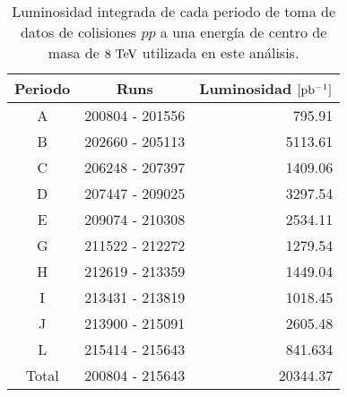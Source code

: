 
\begin{table}[ht]
  \centering
  \caption{Luminosidad integrada de cada periodo de toma de datos de colisiones
    $pp$ a una energía de centro de masa de $8 \tev$ utilizada en este
    análisis.}
  \label{tab:data_periods}

  \begin{tabular}{ccr}
    \hline
    Periodo & Runs & Luminosidad $[\mbox{pb$^{-1}$}]$ \\
    \hline
    A & 200804 - 201556 & 795.91 \\
    B & 202660 - 205113 & 5113.61 \\
    C & 206248 - 207397 & 1409.06 \\
    D & 207447 - 209025 & 3297.54 \\
    E & 209074 - 210308 & 2534.11 \\
    G & 211522 - 212272 & 1279.54 \\
    H & 212619 - 213359 & 1449.04 \\
    I & 213431 - 213819 & 1018.45 \\
    J & 213900 - 215091 & 2605.48 \\
    L & 215414 - 215643 & 841.634 \\
    \hline
    Total & 200804 - 215643 & 20344.37 \\
    \hline
  \end{tabular}

\end{table}



